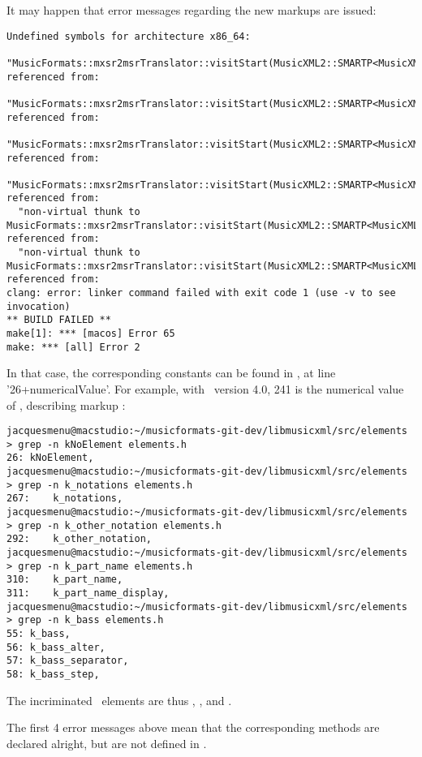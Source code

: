 It may happen that error messages regarding the new markups are issued:
\begin{lstlisting}[language=TerminalSmall]
Undefined symbols for architecture x86_64:
  "MusicFormats::mxsr2msrTranslator::visitStart(MusicXML2::SMARTP<MusicXML2::musicxml<241>>&)", referenced from:
  "MusicFormats::mxsr2msrTranslator::visitStart(MusicXML2::SMARTP<MusicXML2::musicxml<266>>&)", referenced from:
  "MusicFormats::mxsr2msrTranslator::visitStart(MusicXML2::SMARTP<MusicXML2::musicxml<284>>&)", referenced from:
  "MusicFormats::mxsr2msrTranslator::visitStart(MusicXML2::SMARTP<MusicXML2::musicxml<29>>&)", referenced from:
  "non-virtual thunk to MusicFormats::mxsr2msrTranslator::visitStart(MusicXML2::SMARTP<MusicXML2::musicxml<284>>&)", referenced from:
  "non-virtual thunk to MusicFormats::mxsr2msrTranslator::visitStart(MusicXML2::SMARTP<MusicXML2::musicxml<29>>&)", referenced from:
clang: error: linker command failed with exit code 1 (use -v to see invocation)
** BUILD FAILED **
make[1]: *** [macos] Error 65
make: *** [all] Error 2
\end{lstlisting}

In that case, the corresponding constants can be found in , at line '26+numericalValue'. For example, with  \mxml\ version 4.0, 241 is the numerical value of , describing markup :
\begin{lstlisting}[language=TerminalSmall]
jacquesmenu@macstudio:~/musicformats-git-dev/libmusicxml/src/elements > grep -n kNoElement elements.h
26:	kNoElement,
jacquesmenu@macstudio:~/musicformats-git-dev/libmusicxml/src/elements > grep -n k_notations elements.h
267:	k_notations,
jacquesmenu@macstudio:~/musicformats-git-dev/libmusicxml/src/elements > grep -n k_other_notation elements.h
292:	k_other_notation,
jacquesmenu@macstudio:~/musicformats-git-dev/libmusicxml/src/elements > grep -n k_part_name elements.h
310:	k_part_name,
311:	k_part_name_display,
jacquesmenu@macstudio:~/musicformats-git-dev/libmusicxml/src/elements > grep -n k_bass elements.h
55:	k_bass,
56:	k_bass_alter,
57:	k_bass_separator,
58:	k_bass_step,
\end{lstlisting}

The incriminated \mxsrRepr\ elements are thus , ,  and .

The first 4 error messages above mean that the corresponding  methods  are declared alright, but are not defined in .

